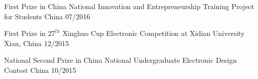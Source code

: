 


\begin{cvhonors}

  \cvhonor
    {First Prize} %
    {in China National Innovation and Entrepreneurship Training Project for Students} %
    {China} %
    {07/2016} %


  \cvhonor
    {First Prize} %
    {in $27^{th}$ Xinghuo Cup Electronic Competition at Xidian University} %
    {Xian, China} %
    {12/2015} %


  \cvhonor
	{National Second Prize} %
	{in China National Undergraduate Electronic Design Contest} %
	{China} %
	{10/2015} %




 
\end{cvhonors}


